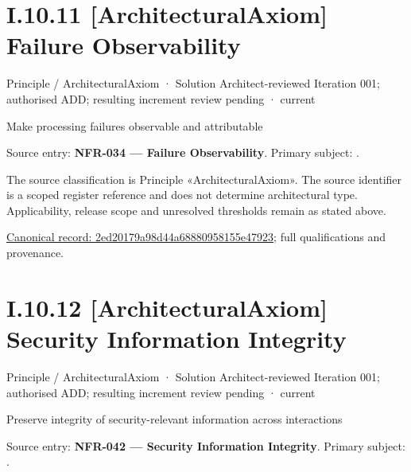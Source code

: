 \section*{I.10.11 [ArchitecturalAxiom] Failure Observability}
\label{navigation:I.10.11}

\label{element:2ed20179a98d44a68880958155e47923}
{\small Principle / ArchitecturalAxiom · Solution Architect-reviewed Iteration 001; authorised ADD; resulting increment review pending · current}\par

Make processing failures observable and attributable



Source entry: \textbf{NFR-034 — Failure Observability}. Primary subject: \texttt{}.



The source classification is Principle «ArchitecturalAxiom». The source identifier is a scoped register reference and does not determine architectural type. Applicability, release scope and unresolved thresholds remain as stated above.


{\footnotesize \href{../../../../../../../continuum/motivation/principle/architectural-axiom/2ed20179a98d44a68880958155e47923.md}{Canonical record: 2ed20179a98d44a68880958155e47923}; full qualifications and provenance.}\par
\section*{I.10.12 [ArchitecturalAxiom] Security Information Integrity}
\label{navigation:I.10.12}

\label{element:52083b57c01d4262bf965afa96489136}
{\small Principle / ArchitecturalAxiom · Solution Architect-reviewed Iteration 001; authorised ADD; resulting increment review pending · current}\par

Preserve integrity of security-relevant information across interactions



Source entry: \textbf{NFR-042 — Security Information Integrity}. Primary subject: \texttt{}.



